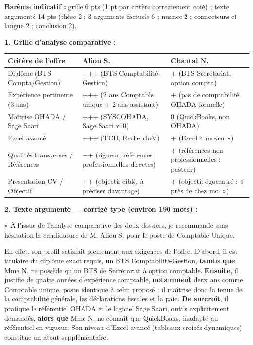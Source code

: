\documentclass[11pt]{article}
\begin{document}
\begin{corrige}
\textbf{Barème indicatif :} grille 6 pts (1 pt par critère correctement coté) ; texte argumenté 14 pts (thèse 2 ; 3 arguments factuels 6 ; nuance 2 ; connecteurs et langue 2 ; conclusion 2).

\textbf{1. Grille d'analyse comparative :}
\begin{center}
\begin{tabularx}{\linewidth}{|l|X|X|}\hline
\rowcolor{popblueL} \textbf{Critère de l'offre} & \textbf{Aliou S.} & \textbf{Chantal N.} \\ \hline
Diplôme (BTS Compta/Gestion) & +++ (BTS Comptabilité-Gestion) & + (BTS Secrétariat, option compta) \\ \hline
Expérience pertinente (3 ans) & +++ (2 ans Comptable unique + 2 ans assistant) & + (pas de comptabilité OHADA formelle) \\ \hline
Maîtrise OHADA / Sage Saari & +++ (SYSCOHADA, Sage Saari v10) & 0 (QuickBooks, non OHADA) \\ \hline
Excel avancé & +++ (TCD, RechercheV) & + (Excel « moyen ») \\ \hline
Qualités transverses / Références & ++ (rigueur, références professionnelles directes) & + (références non professionnelles : pasteur) \\ \hline
Présentation CV / Objectif & ++ (objectif ciblé, à préciser davantage) & + (objectif égocentré : « près de chez moi ») \\ \hline
\end{tabularx}
\end{center}

\textbf{2. Texte argumenté — corrigé type (environ 190 mots) :}

« À l'issue de l'analyse comparative des deux dossiers, je recommande sans hésitation la candidature de M. Aliou S. pour le poste de Comptable Unique.

En effet, son profil satisfait pleinement aux exigences de l'offre. D'abord, il est titulaire du diplôme exact requis, un BTS Comptabilité-Gestion, \textbf{tandis que} Mme N. ne possède qu'un BTS de Secrétariat à option comptable. \textbf{Ensuite}, il justifie de quatre années d'expérience comptable, \textbf{notamment} deux ans comme Comptable unique, poste identique à celui proposé : il maîtrise donc la tenue de la comptabilité générale, les déclarations fiscales et la paie. \textbf{De surcroît}, il pratique le référentiel OHADA et le logiciel Sage Saari, outils explicitement demandés, \textbf{alors que} Mme N. ne connaît que QuickBooks, inadapté au référentiel en vigueur. Son niveau d'Excel avancé (tableaux croisés dynamiques) constitue un atout supplémentaire.


\end{corrige}
\end{document}
